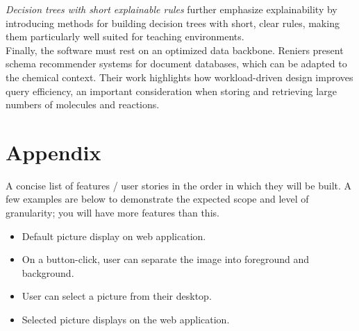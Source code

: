 \documentclass[12pt]{article}
\begin{document}
\textit{Decision trees with short explainable rules} further emphasize explainability by introducing methods for building decision trees with short, clear rules, making them particularly well suited for teaching environments. \cite{10.1016/j.tcs.2025.115344}
\\
\indent
Finally, the software must rest on an optimized data backbone. Reniers present schema recommender systems for document databases, which can be adapted to the chemical context. Their work highlights how workload-driven design improves query efficiency, an important consideration when storing and retrieving large numbers of molecules and reactions. \cite{10.1007/978-3-030-62522-1_35}



\newpage
\section*{Appendix}
A concise list of features / user stories in the order in which they will be built. A few examples are below to demonstrate the expected scope and level of granularity; you will have more features than this.
\begin{itemize}
	\item Default picture display on web application.
	\item On a button-click, user can separate the image into foreground and background.
	\item User can select a picture from their desktop.
	\item Selected picture displays on the web application.
\end{itemize}




\end{document}
